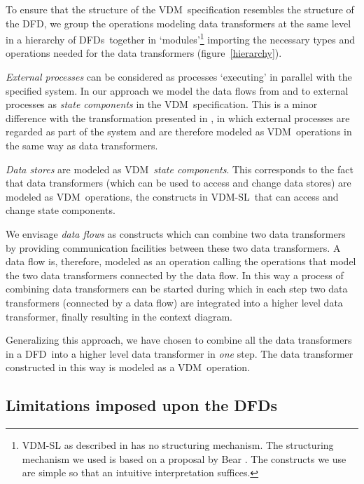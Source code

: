 \documentclass[11pt]{article}
\newcommand{\figdir}{/home/peter/toolbox}
\newcommand{\VDM}{{\small VDM}}
\newcommand{\VDMSL}{{\small VDM-SL}}
\newcommand{\DFD}{{\small DFD}}
\newcommand{\DFDs}{{\small DFD}s}
\newcommand{\makefigure}[3]{\begin{figure}[ht]
{\leavevmode
\centering
\epsfbox{\figdir/#1.eps}
\caption{#2}\label{#3}}
\end{figure}}
\begin{document}
To ensure that the structure of the \VDM\ specification
resembles the structure of the \DFD,
we group the operations modeling data transformers at the same level in
a hierarchy of \DFDs\ together in `modules'\footnote{%
{\tiny VDM-SL} as described in \cite{BSIVDM92b} has no structuring mechanism.
The structuring mechanism we used is based on a proposal by Bear
\cite{Bear88}. The constructs we use are simple so that an intuitive
interpretation suffices.}
importing the necessary types and
operations needed for the data transformers
(figure~\ref{hierarchy}).



{\em External processes} can be considered as processes `executing' in parallel with
the specified system.
In our approach we model the data flows from and to external processes
as {\em state components} in the \VDM\ specification.
This is a minor difference with the transformation presented in
\cite{Plat&91a},
in which external processes are regarded as part of the system and
are therefore modeled as \VDM\ operations in the same way as data transformers.


{\em Data stores} are modeled as \VDM\ {\em state components}.
This corresponds to the fact that data transformers
(which can be used to access and change data stores)
are modeled as \VDM\ operations,
the constructs in \VDMSL\ that can access and change state components.


We envisage {\em data flows} as constructs which can combine
two data transformers by providing communication facilities between
these two data transformers.
A data flow is, therefore, modeled as an operation
calling the operations that model the two data transformers connected by
the data flow. 
In this way a process of combining data transformers can be started during
which in each step two data transformers (connected by a data flow) are
integrated into a higher level data transformer, finally resulting in
the context diagram.

Generalizing this approach, we have chosen to combine 
all the data transformers in a \DFD\ into a
higher level data transformer in {\em one} step.
The data transformer constructed in this way is modeled as a \VDM\ operation.

\subsection{Limitations imposed upon the DFDs}
\end{document}
